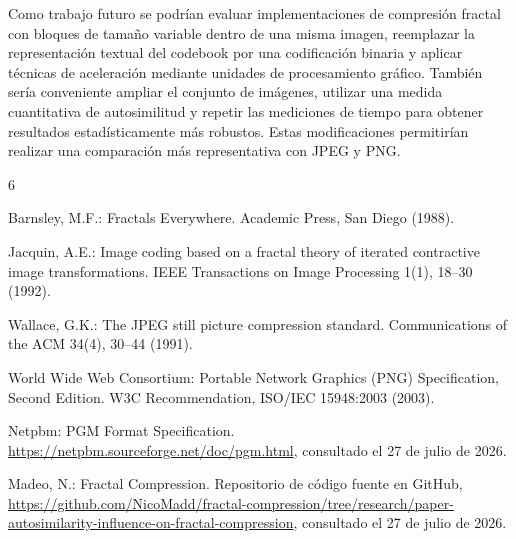 \documentclass[a4paper]{llncs}
\begin{document}
Como trabajo futuro se podrían evaluar implementaciones de compresión fractal con bloques de tamaño variable dentro de una misma imagen, reemplazar la representación textual del codebook por una codificación binaria y aplicar técnicas de aceleración mediante unidades de procesamiento gráfico. También sería conveniente ampliar el conjunto de imágenes, utilizar una medida cuantitativa de autosimilitud y repetir las mediciones de tiempo para obtener resultados estadísticamente más robustos. Estas modificaciones permitirían realizar una comparación más representativa con JPEG y PNG.


\begin{thebibliography}{6}

Barnsley, M.F.:
Fractals Everywhere.
Academic Press, San Diego (1988).

Jacquin, A.E.:
Image coding based on a fractal theory of iterated contractive
image transformations.
IEEE Transactions on Image Processing 1(1), 18--30 (1992).

Wallace, G.K.:
The JPEG still picture compression standard.
Communications of the ACM 34(4), 30--44 (1991).

World Wide Web Consortium:
Portable Network Graphics (PNG) Specification, Second Edition.
W3C Recommendation, ISO/IEC 15948:2003 (2003).

Netpbm:
PGM Format Specification.
\url{https://netpbm.sourceforge.net/doc/pgm.html},
consultado el 27 de julio de 2026.

Madeo, N.:
Fractal Compression.
Repositorio de código fuente en GitHub,
\url{https://github.com/NicoMadd/fractal-compression/tree/research/paper-autosimilarity-influence-on-fractal-compression},
consultado el 27 de julio de 2026.

\end{thebibliography}
\end{document}
